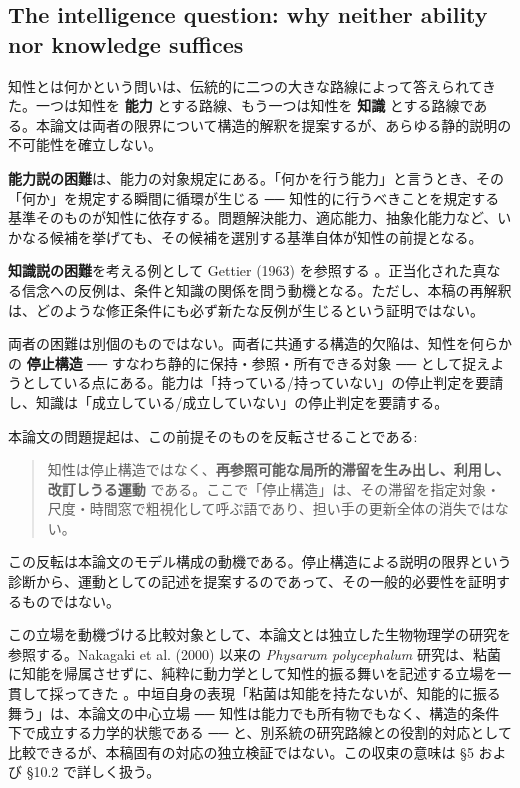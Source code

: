 \subsection{The intelligence question: why neither ability nor knowledge suffices}


知性とは何かという問いは、伝統的に二つの大きな路線によって答えられてきた。一つは知性を \textbf{能力} とする路線、もう一つは知性を \textbf{知識} とする路線である。本論文は両者の限界について構造的解釈を提案するが、あらゆる静的説明の不可能性を確立しない。

\textbf{能力説の困難}は、能力の対象規定にある。「何かを行う能力」と言うとき、その「何か」を規定する瞬間に循環が生じる ── 知性的に行うべきことを規定する基準そのものが知性に依存する。問題解決能力、適応能力、抽象化能力など、いかなる候補を挙げても、その候補を選別する基準自体が知性の前提となる。

\textbf{知識説の困難}を考える例として Gettier (1963) を参照する \citep{Gettier1963}。正当化された真なる信念への反例は、条件と知識の関係を問う動機となる。ただし、本稿の再解釈は、どのような修正条件にも必ず新たな反例が生じるという証明ではない。

両者の困難は別個のものではない。両者に共通する構造的欠陥は、知性を何らかの \textbf{停止構造} ── すなわち静的に保持・参照・所有できる対象 ── として捉えようとしている点にある。能力は「持っている/持っていない」の停止判定を要請し、知識は「成立している/成立していない」の停止判定を要請する。

本論文の問題提起は、この前提そのものを反転させることである:

\begin{quote}
知性は停止構造ではなく、\textbf{再参照可能な局所的滞留を生み出し、利用し、改訂しうる運動} である。ここで「停止構造」は、その滞留を指定対象・尺度・時間窓で粗視化して呼ぶ語であり、担い手の更新全体の消失ではない。
\end{quote}

この反転は本論文のモデル構成の動機である。停止構造による説明の限界という診断から、運動としての記述を提案するのであって、その一般的必要性を証明するものではない。

この立場を動機づける比較対象として、本論文とは独立した生物物理学の研究を参照する。Nakagaki et al. (2000) 以来の \emph{Physarum polycephalum} 研究は、粘菌に知能を帰属させずに、純粋に動力学として知性的振る舞いを記述する立場を一貫して採ってきた \citep{Nakagaki2000,Tero2007}。中垣自身の表現「粘菌は知能を持たないが、知能的に振る舞う」は、本論文の中心立場 ── 知性は能力でも所有物でもなく、構造的条件下で成立する力学的状態である ── と、別系統の研究路線との役割的対応として比較できるが、本稿固有の対応の独立検証ではない。この収束の意味は \S{}5 および \S{}10.2 で詳しく扱う。

